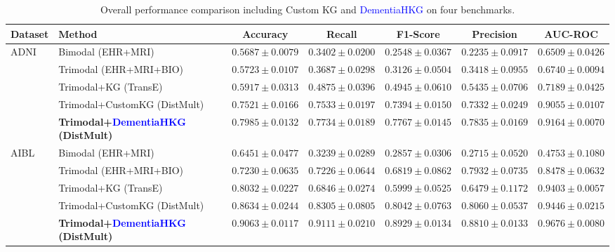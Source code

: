 \documentclass[lettersize,journal]{IEEEtran}
\begin{document}
\begin{table}[t]
    \centering
    \caption{Overall performance comparison including Custom KG and \textcolor{blue}{DementiaHKG} on four benchmarks.}
    \label{tab:overall_results_merged}
    \begin{tabular}{llccccc}
        \toprule
        Dataset & Method & Accuracy & Recall & F1-Score & Precision & AUC-ROC \\
        \midrule
        \multirow{5}{*}{ADNI}
            & Bimodal (EHR+MRI) & $0.5687 \pm 0.0079$ & $0.3402 \pm 0.0200$ & $0.2548 \pm 0.0367$ & $0.2235 \pm 0.0917$ & $0.6509 \pm 0.0426$ \\
            & Trimodal (EHR+MRI+BIO) & $0.5723 \pm 0.0107$ & $0.3687 \pm 0.0298$ & $0.3126 \pm 0.0504$ & $0.3418 \pm 0.0955$ & $0.6740 \pm 0.0094$ \\
            & Trimodal+KG (TransE) & $0.5917 \pm 0.0313$ & $0.4875 \pm 0.0396$ & $0.4945 \pm 0.0610$ & $0.5435 \pm 0.0706$ & $0.7189 \pm 0.0425$ \\
            & Trimodal+CustomKG (DistMult) & $0.7521 \pm 0.0166$ & $0.7533 \pm 0.0197$ & $0.7394 \pm 0.0150$ & $0.7332 \pm 0.0249$ & $0.9055 \pm 0.0107$ \\
            & \textbf{Trimodal+\textcolor{blue}{DementiaHKG} (DistMult)} & $\mathbf{0.7985 \pm 0.0132}$ & $\mathbf{0.7734 \pm 0.0189}$ & $\mathbf{0.7767 \pm 0.0145}$ & $\mathbf{0.7835 \pm 0.0169}$ & $\mathbf{0.9164 \pm 0.0070}$ \\
        \midrule
        \multirow{5}{*}{AIBL}
            & Bimodal (EHR+MRI) & $0.6451 \pm 0.0477$ & $0.3239 \pm 0.0289$ & $0.2857 \pm 0.0306$ & $0.2715 \pm 0.0520$ & $0.4753 \pm 0.1080$ \\
            & Trimodal (EHR+MRI+BIO) & $0.7230 \pm 0.0635$ & $0.7226 \pm 0.0644$ & $0.6819 \pm 0.0862$ & $0.7932 \pm 0.0735$ & $0.8478 \pm 0.0632$ \\
            & Trimodal+KG (TransE) & $0.8032 \pm 0.0227$ & $0.6846 \pm 0.0274$ & $0.5999 \pm 0.0525$ & $0.6479 \pm 0.1172$ & $0.9403 \pm 0.0057$ \\
            & Trimodal+CustomKG (DistMult) & $0.8634 \pm 0.0244$ & $0.8305 \pm 0.0805$ & $0.8042 \pm 0.0763$ & $0.8060 \pm 0.0537$ & $0.9446 \pm 0.0215$ \\
            & \textbf{Trimodal+\textcolor{blue}{DementiaHKG} (DistMult)} & $\mathbf{0.9063 \pm 0.0117}$ & $\mathbf{0.9111 \pm 0.0210}$ & $\mathbf{0.8929 \pm 0.0134}$ & $\mathbf{0.8810 \pm 0.0133}$ & $\mathbf{0.9676 \pm 0.0080}$ \\
        \midrule

\end{tabular}
\end{table}
\end{document}
